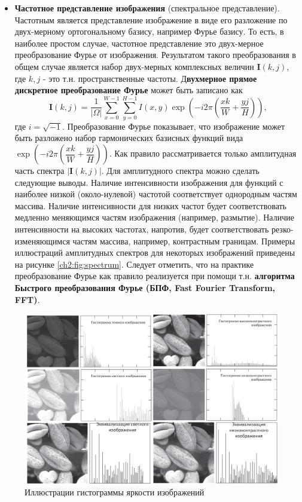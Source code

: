 \documentclass[12pt]{article}
\begin{document}
\begin{sloppypar}
\begin{itemize}
    \item \textbf{Частотное представление изображения} (спектральное представление). Частотным является представление изображение в виде его разложение по двух-мерному ортогональному базису, например Фурье базису. То есть, в наиболее простом случае, частотное представление это двух-мерное преобразование Фурье от изображения. Результатом такого преобразования в общем случае является набор двух-мерных комплексных величин $\mathbf{I}(k,j)$,
    где $k,j$ - это т.н. пространственные частоты. Д\textbf{вухмерное прямое дискретное преобразование Фурье} может быть записано как
        \begin{equation}
           \mathbf{I}(k,j) = \dfrac{1}{|\Omega|}\sum_{x=0}^{W-1}\sum_{y=0}^{H-1}I(x,y)\exp\left(-i2\pi\left(\dfrac{xk}{W}+\dfrac{yj}{H}\right)\right),
        \end{equation}
    где $i = \sqrt{-1}$. \newline
    Преобразование Фурье показывает, что изображение может быть разложено набор гармонических базисных функций вида $\exp(-i2\pi(\dfrac{xk}{W}+\dfrac{yj}{H}))$. Как правило рассматривается только амплитудная часть спектра $|\mathbf{I}(k,j)|$. Для амплитудного спектра можно сделать следующие выводы. Наличие интенсивности изображения для функций с наиболее низкой (около-нулевой) частотой соответствует однородным частям массива. Наличие интенсивности для низких частот будет соответствовать медленно меняющимся частям изображения (например, размытие). Наличие интенсивности на высоких частотах, напротив, будет соответствовать резко-изменяющимся частям массива, например, контрастным границам. Примеры иллюстраций амплитудных спектров для некоторых изображений приведены на рисунке \ref{ch2:fig:spectrum}. Следует отметить, что на практике преобразование Фурье как правило реализуется при помощи  т.н. \textbf{алгоритма Быстрого преобразования Фурье (БПФ, Fast Fourier Transform, FFT)}.
\end{itemize}

    \begin{figure}[!h]
    	\begin{center}
    		\includegraphics[width=0.69\linewidth]{./figuresch2/Histogramm.png}
    		\caption{Иллюстрации гистограммы яркости изображений}		
    		\label{ch2:fig:histogram}
    	\end{center}
    \end{figure}


\end{sloppypar}
\end{document}
